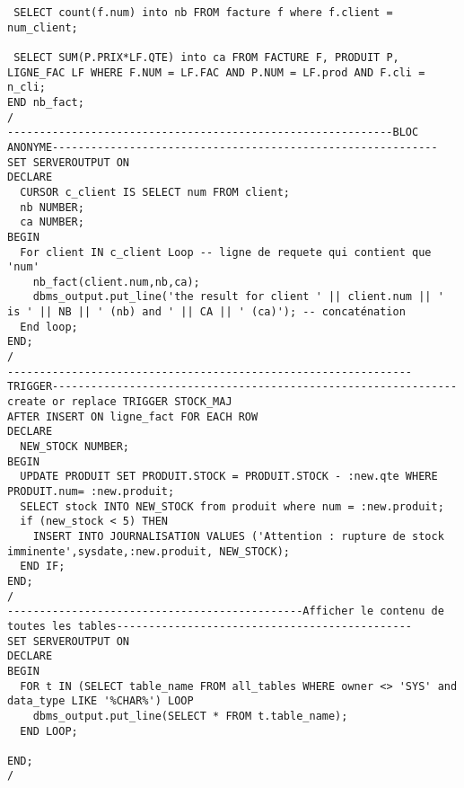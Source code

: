 \documentclass[11pt,a4paper,oneside,french,svgnames]{report}
\begin{document}
\begin{lstlisting}
 SELECT count(f.num) into nb FROM facture f where f.client = num_client;
 
 SELECT SUM(P.PRIX*LF.QTE) into ca FROM FACTURE F, PRODUIT P, LIGNE_FAC LF WHERE F.NUM = LF.FAC AND P.NUM = LF.prod AND F.cli = n_cli;
END nb_fact;
/
------------------------------------------------------------BLOC ANONYME------------------------------------------------------------
SET SERVEROUTPUT ON
DECLARE
  CURSOR c_client IS SELECT num FROM client;
  nb NUMBER; 
  ca NUMBER;
BEGIN
  For client IN c_client Loop -- ligne de requete qui contient que 'num'
    nb_fact(client.num,nb,ca);
    dbms_output.put_line('the result for client ' || client.num || ' is ' || NB || ' (nb) and ' || CA || ' (ca)'); -- concaténation
  End loop;
END;
/
---------------------------------------------------------------TRIGGER---------------------------------------------------------------
create or replace TRIGGER STOCK_MAJ
AFTER INSERT ON ligne_fact FOR EACH ROW
DECLARE
  NEW_STOCK NUMBER;
BEGIN
  UPDATE PRODUIT SET PRODUIT.STOCK = PRODUIT.STOCK - :new.qte WHERE PRODUIT.num= :new.produit;
  SELECT stock INTO NEW_STOCK from produit where num = :new.produit;
  if (new_stock < 5) THEN
    INSERT INTO JOURNALISATION VALUES ('Attention : rupture de stock imminente',sysdate,:new.produit, NEW_STOCK);
  END IF;
END;
/
----------------------------------------------Afficher le contenu de toutes les tables----------------------------------------------
SET SERVEROUTPUT ON
DECLARE
BEGIN
  FOR t IN (SELECT table_name FROM all_tables WHERE owner <> 'SYS' and data_type LIKE '%CHAR%') LOOP
    dbms_output.put_line(SELECT * FROM t.table_name);
  END LOOP;

END;
/
\end{lstlisting}

\newpage
\end{document}
